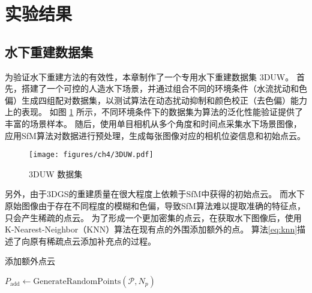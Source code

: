 \section{实验结果}
\subsection{水下重建数据集}
为验证水下重建方法的有效性，本章制作了一个专用水下重建数据集 3DUW。
首先，搭建了一个可控的人造水下场景，并通过组合不同的环境条件（水流扰动和色偏）生成四组配对数据集，以测试算法在动态扰动抑制和颜色校正（去色偏）能力上的表现。
如图 \ref{img:3DUW} 所示，不同环境条件下的数据集为算法的泛化性能验证提供了丰富的场景样本。
随后，使用单目相机从多个角度和时间点采集水下场景图像，应用SfM算法\cite{sfm1}\cite{sfm2}对数据进行预处理，生成每张图像对应的相机位姿信息和初始点云。
\begin{figure}
    \centering
    \texttt{[image: figures/ch4/3DUW.pdf]}
    \caption{3DUW 数据集}
    \label{img:3DUW}
\end{figure}

另外，由于3DGS的重建质量在很大程度上依赖于SfM中获得的初始点云。
而水下原始图像由于存在不同程度的模糊和色偏，导致SfM算法难以提取准确的特征点，只会产生稀疏的点云。
为了形成一个更加密集的点云，在获取水下图像后，使用K-Nearest-Neighbor（KNN）算法在现有点的外围添加额外的点。
算法\ref{eq:knn}描述了向原有稀疏点云添加补充点的过程。
\begin{algorithm}[t]
    \caption{\label{eq:knn}添加额外点云}
    
    $P_\text{add} \leftarrow \text{GenerateRandomPoints}(\mathcal{P}, N_p)$
    
\end{algorithm}


